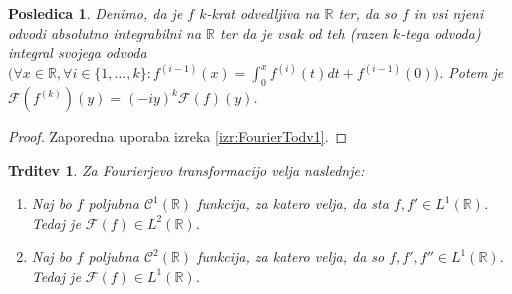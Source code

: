 \documentclass[a4paper, 10pt]{article}
\newtheorem{trd}{Trditev}
\newtheorem{posl}{Posledica}[izr]
\newcommand{\mth}[1]{\ensuremath{\mathbb{#1}}}
\newcommand{\R}{\mth{R}}
\begin{document}
			\begin{posl}
				\label{posl:FTodvN}
				Denimo, da je $f$ $k$-krat odvedljiva na $\R$ ter, da so $f$ in vsi njeni odvodi absolutno integrabilni na $\R$ ter da je vsak od teh (razen $k$-tega odvoda) integral svojega odvoda $\big(\forall x\in\R, \forall i\in \{1, \ldots, k\}: f^{(i-1)}(x) = \int_{0}^{x}f^{(i)}(t)dt + f^{(i-1)}(0)\big)$. Potem je $\mathcal{F}(f^{(k)})(y) = (-iy)^k\mathcal{F}(f)(y)$.
			\end{posl}
			\begin{proof}
				Zaporedna uporaba izreka \ref{izr:FourierTodv1}.
			\end{proof}
			
			\begin{trd}
				\label{trd:FTL1}
				Za Fourierjevo transformacijo velja naslednje: \begin{enumerate}
				\item Naj bo $f$ poljubna $\mathcal{C}^1(\R)$ funkcija, za katero velja, da sta $f, f'\in L^1(\R)$. Tedaj je $\mathcal{F}(f) \in L^2(\R)$.
				\item Naj bo $f$ poljubna $\mathcal{C}^2(\R)$ funkcija, za katero velja, da so $f, f', f''\in L^1(\R)$. Tedaj je $\mathcal{F}(f) \in L^1(\R)$.
			\end{enumerate}
			\end{trd}
\end{document}

